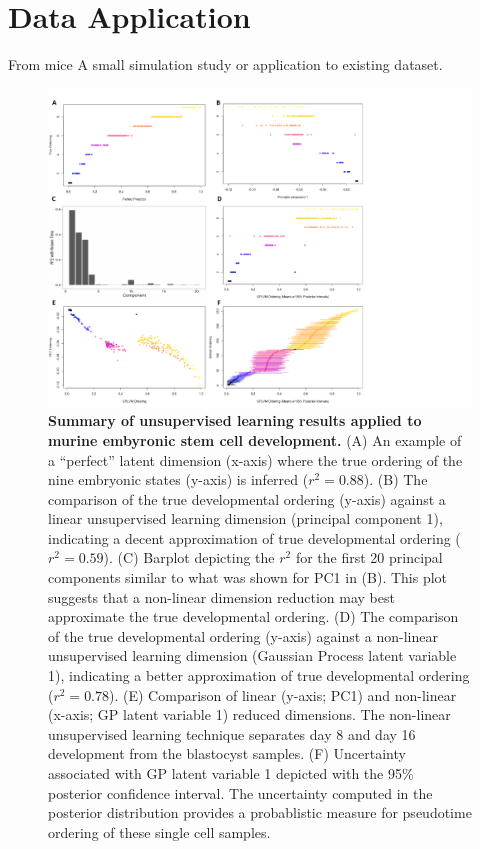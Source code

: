 \documentclass[english, 11pt]{article}\usepackage[]{graphicx}\usepackage[]{color}
\begin{document}
\section{Data Application}
From mice \cite{deng2014single}
A small simulation study or application to existing dataset.

\begin{figure}[H]
\begin{center}
\includegraphics[scale=0.8]{images/Figure3.pdf}
\end{center}
\caption{\textbf{Summary of unsupervised learning results applied to murine embyronic stem cell development.} (A) An example of a ``perfect'' latent dimension (x-axis) where the true ordering of the nine embryonic states (y-axis) is inferred ($r^2 = 0.88$). (B) The comparison of the true developmental ordering (y-axis) against a linear unsupervised learning dimension (principal component 1), indicating a decent approximation of true developmental ordering ($r^2 = 0.59$). (C) Barplot depicting the $r^2$ for the first 20 principal components similar to what was shown for PC1 in (B). This plot suggests that a non-linear dimension reduction may best approximate the true developmental ordering. (D) The comparison of the true developmental ordering (y-axis) against a non-linear unsupervised learning dimension (Gaussian Process latent variable 1), indicating a better approximation of true developmental ordering ($r^2 = 0.78$). (E) Comparison of linear (y-axis; PC1) and non-linear (x-axis; GP latent variable 1) reduced dimensions. The non-linear unsupervised learning technique separates day 8 and day 16 development from the blastocyst samples. (F) Uncertainty associated with GP latent variable 1 depicted with the 95\% posterior confidence interval. The uncertainty computed in the posterior distribution provides a probablistic measure for pseudotime ordering of these single cell samples. }
\end{figure}
\end{document}
